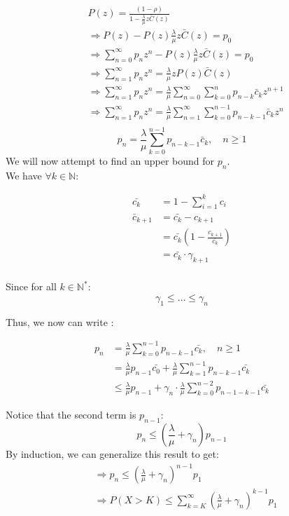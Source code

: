 \documentclass{article}
\begin{document}
\begin{align*}
&P(z) = \frac{(1-\rho)}{1-\frac{\lambda}{\mu} z \bar{C}(z)}\\
&\Rightarrow P(z) - P(z) \frac{\lambda}{\mu} z \bar{C}(z) = p_0\\
&\Rightarrow\sum_{n=0}^{\infty} p_n z^n - P(z) \frac{\lambda}{\mu} z \bar{C}(z) = p_0\\
&\Rightarrow\sum_{n=1}^{\infty} p_n z^n = \frac{\lambda}{\mu} z P(z) \bar{C}(z)\\
&\Rightarrow\sum_{n=1}^{\infty} p_n z^n = \frac{\lambda}{\mu} \sum_{n=0}^{\infty} \sum_{k=0}^{n} p_{n-k} \bar{c}_k z^{n+1}\\
&\Rightarrow\sum_{n=1}^{\infty} p_n z^n = \frac{\lambda}{\mu} \sum_{n=1}^{\infty} \sum_{k=0}^{n-1} p_{n-k-1} \bar{c}_k z^n\\
\end{align*}
\begin{equation*}
\boxed{p_n = \frac{\lambda}{\mu} \sum_{k=0}^{n-1} p_{n-k-1} \bar{c}_k , \quad n \geq 1}
\end{equation*}
We will now attempt to find an upper bound for \( p_n \).\\

We have \(\forall k \in \mathbb{N}\):

\begin{align*}
\bar{c_k} &= 1 - \sum_{i=1}^{k} c_i\\
\bar{c}_{k+1} &= \bar{c_k} - c_{k+1}\\
&=\bar{c_k} \left(1 - \frac{c_{k+1}}{\bar{c_k}} \right)\\
&= \bar{c_k} \cdot \gamma_{k+1}\\
\end{align*}

Since for all \( k \in \mathbb{N^*} \):\\
\[
\gamma_{1} \leq \dots \leq \gamma_{n}
\]

Thus, we now can write :

\begin{align*}
p_n &= \frac{\lambda}{\mu} \sum_{k=0}^{n-1} p_{n-k-1} \bar{c_k}, \quad n \geq 1 \\
&= \frac{\lambda}{\mu} p_{n-1} \bar{c_0} + \frac{\lambda}{\mu} \sum_{k=1}^{n-1} p_{n-k-1} \bar{c_k} \\
&\leq \frac{\lambda}{\mu} p_{n-1} + \gamma_{n} \cdot \frac{\lambda}{\mu} \sum_{k=0}^{n-2} p_{n-1-k-1} \bar{c_k}
\end{align*}

Notice that the second term is \( p_{n-1} \):
\[
p_n \leq \left( \frac{\lambda}{\mu} + \gamma_{n} \right) p_{n-1}
\]
By induction, we can generalize this result to get:
\begin{align*}
&\Rightarrow p_n \leq \left( \frac{\lambda}{\mu} + \gamma_{n} \right)^{n-1} p_1 \\
&\Rightarrow P(X > K) \leq \sum_{k=K}^{\infty} \left( \frac{\lambda}{\mu} + \gamma_{n} \right)^{k-1} p_1
\end{align*}
\end{document}

